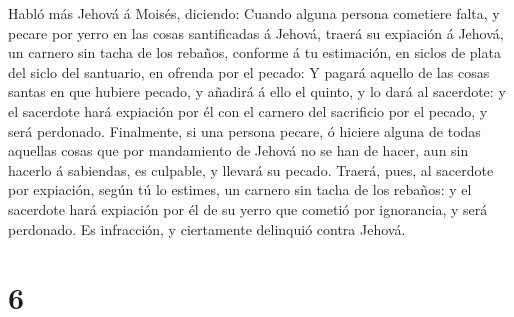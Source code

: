 Habló más Jehová á Moisés, diciendo:  Cuando alguna persona
cometiere falta, y pecare por yerro en las cosas santificadas á Jehová,
traerá su expiación á Jehová, un carnero sin tacha de los rebaños,
conforme á tu estimación, en siclos de plata del siclo del santuario, en
ofrenda por el pecado:  Y pagará aquello de las cosas
santas en que hubiere pecado, y añadirá á ello el quinto, y lo dará al
sacerdote: y el sacerdote hará expiación por él con el carnero del
sacrificio por el pecado, y será perdonado.  Finalmente, si
una persona pecare, ó hiciere alguna de todas aquellas cosas que por
mandamiento de Jehová no se han de hacer, aun sin hacerlo á sabiendas,
es culpable, y llevará su pecado.  Traerá, pues, al
sacerdote por expiación, según tú lo estimes, un carnero sin tacha de
los rebaños: y el sacerdote hará expiación por él de su yerro que
cometió por ignorancia, y será perdonado.  Es infracción, y
ciertamente delinquió contra Jehová.

\hypertarget{section-5}{%
\section{6}\label{section-5}}

